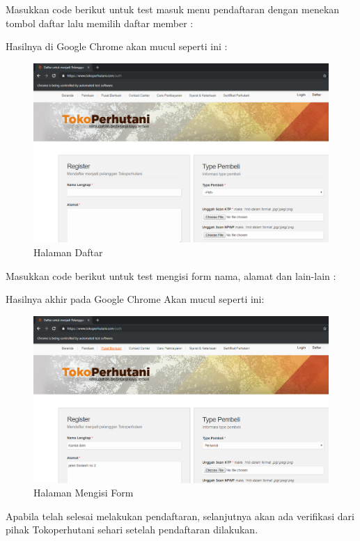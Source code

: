 Masukkan code berikut untuk test masuk menu pendaftaran dengan menekan tombol daftar lalu memilih daftar member :


Hasilnya  di Google Chrome akan mucul seperti ini :
\begin{figure}[h]
	\centering
	\includegraphics[scale=0.25]{figures/3daftar}
	\caption{Halaman Daftar}
\end{figure}

\pagebreak
Masukkan code berikut untuk test mengisi form nama, alamat dan lain-lain :



Hasilnya akhir pada Google Chrome Akan mucul seperti ini:
\begin{figure}[h]
	\centering
	\includegraphics[scale=0.30]{figures/4daftar}
	\caption{Halaman Mengisi Form}
\end{figure}

Apabila telah selesai melakukan pendaftaran, selanjutnya akan ada verifikasi dari pihak Tokoperhutani sehari setelah pendaftaran dilakukan.

